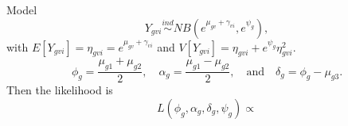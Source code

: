 \documentclass{article}
\begin{document}
Model 
\begin{equation} 
Y_{gvi} \stackrel{ind}{\sim} NB\left(e^{\mu_{gv}+\gamma_{vi}},e^{\psi_g}\right), 
\label{e:data}
\end{equation}
with $E[Y_{gvi}] = \eta_{gvi} =e^{\mu_{gv}+\gamma_{vi}}$ and $V[Y_{gvi}] = \eta_{gvi} + e^{\psi_g}\eta_{gvi}^2$.
\[ \phi_g = \frac{\mu_{g1}+\mu_{g2}}{2}, \quad 
\alpha_g = \frac{\mu_{g1}-\mu_{g2}}{2}, \quad \mbox{and} \quad
\delta_g = \phi_g-\mu_{g3}. \]
Then the likelihood is 
\[ L(\phi_g,\alpha_g,\delta_g,\psi_g) \propto \]
\end{document}
